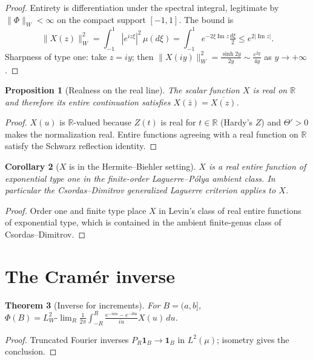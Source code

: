 \documentclass[11pt,reqno]{amsart}
\theoremstyle{plain}
\newtheorem{theorem}{Theorem}[section]
\newtheorem{proposition}[theorem]{Proposition}
\newtheorem{corollary}[theorem]{Corollary}
\theoremstyle{definition}
\theoremstyle{remark}
\newcommand{\R}{\mathbb R}
\begin{document}
\begin{proof}
Entirety is differentiation under the spectral integral, legitimate by
\(\|\Phi\|_W<\infty\) on the compact support \([-1,1]\). The bound is
\[
\|X(z)\|_W^2
=\int_{-1}^{1}|e^{iz\xi}|^2\,\mu(d\xi)
=\int_{-1}^{1}e^{-2\xi\operatorname{Im}z}\tfrac{d\xi}{2}
\le e^{2|\operatorname{Im}z|}.
\]
Sharpness of type one: take \(z=iy\); then
\(\|X(iy)\|_W^2=\tfrac{\sinh 2y}{2y}\sim\tfrac{e^{2y}}{4y}\) as \(y\to+\infty\).
\end{proof}

\begin{proposition}[Realness on the real line]\label{prop:real}
The scalar function \(X\) is real on \(\R\) and therefore its entire
continuation satisfies \(X(\bar z)=\overline{X(z)}\).
\end{proposition}

\begin{proof}
\(X(u)\) is \(\R\)-valued because \(Z(t)\) is real for \(t\in\R\) (Hardy's
\(Z\)) and \(\Theta'>0\) makes the normalization real. Entire functions
agreeing with a real function on \(\R\) satisfy the Schwarz reflection
identity.
\end{proof}

\begin{corollary}[\(X\) is in the Hermite--Biehler setting]\label{cor:HB}
\(X\) is a real entire function of exponential type one in the
finite-order Laguerre--P\'olya ambient class. In particular the
Csordas--Dimitrov generalized Laguerre criterion applies to \(X\).
\end{corollary}

\begin{proof}
Order one and finite type place \(X\) in Levin's class of real entire
functions of exponential type, which is contained in the ambient
finite-genus class of Csordas--Dimitrov.
\end{proof}

\section{The Cram\'er inverse}

\begin{theorem}[Inverse for increments]\label{thm:inverse}
For \(B=(a,b]\),
\(\Phi(B)=L_W^2\text{-}\lim_R\tfrac1{2\pi}\int_{-R}^{R}\tfrac{e^{-iau}-e^{-ibu}}{iu}X(u)\,du\).
\end{theorem}

\begin{proof}
Truncated Fourier inverses \(P_R\mathbf 1_B\to\mathbf 1_B\) in
\(L^2(\mu)\); isometry gives the conclusion.
\end{proof}
\end{document}
